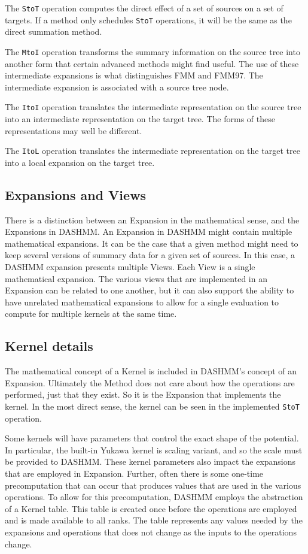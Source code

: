 The \texttt{StoT} operation computes the direct effect of a set of sources on
a set of targets. If a method only schedules \texttt{StoT} operations, it will
be the same as the direct summation method.

The \texttt{MtoI} operation transforms the summary information on the source
tree into another form that certain advanced methods might find useful. The use
of these intermediate expansions is what distinguishes FMM and FMM97. The
intermediate expansion is associated with a source tree node.

The \texttt{ItoI} operation translates the intermediate representation on the
source tree into an intermediate representation on the target tree. The forms
of these representations may well be different.

The \texttt{ItoL} operation translates the intermediate representation on the
target tree into a local expansion on the target tree.

\subsection{Expansions and Views}

There is a distinction between an Expansion in the mathematical sense, and the
Expansions in DASHMM. An Expansion in DASHMM might contain multiple mathematical
expansions. It can be the case that a given method might need to keep
several versions of summary data for a given set of sources. In this case,
a DASHMM expansion presents multiple Views. Each View is a single mathematical
expansion. The various views that are implemented in an Expansion can be
related to one another, but it can also support the ability to have unrelated
mathematical expansions to allow for a single evaluation to compute for
multiple kernels at the same time.

\subsection{Kernel details}

The mathematical concept of a Kernel is included in DASHMM's concept of an
Expansion. Ultimately the Method does not care about how the operations are
performed, just that they exist. So it is the Expansion that implements the
kernel. In the most direct sense, the kernel can be seen in the implemented
\texttt{StoT} operation.

Some kernels will have parameters that control the exact shape of the potential.
In particular, the built-in Yukawa kernel is scaling variant, and so the
scale must be provided to DASHMM. These kernel parameters also impact the
expansions that are employed in Expansion. Further, often there is some one-time
precomputation that can occur that produces values that are used in the various
operations. To allow for this precomputation, DASHMM employs the abstraction
of a Kernel table. This table is created once before the operations are employed
and is made available to all ranks. The table represents any values needed
by the expansions and operations that does not change as the inputs to the
operations change.



